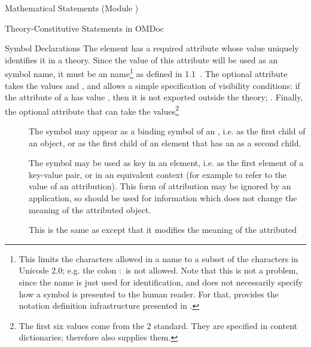 \begin{tchapter}[id=statements,short=Mathematical Statements]{Mathematical Statements (Module {})}
\begin{tsection}[id=definitions]{Theory-Constitutive Statements in OMDoc}
\begin{tsubsection}[id=symbol-dec]{Symbol Declarations}
  The {} element has a required attribute {} whose
  value uniquely identifies it in a theory.  Since the value of this attribute will be
  used as an {\openmath} symbol name, it must be an {\xml} name\footnote{This limits the
    characters allowed in a name to a subset of the characters in Unicode 2.0; e.g. the
    colon $\colon$ is not allowed. Note that this is not a problem, since the name is just
    used for identification, and does not necessarily specify how a symbol is presented to
    the human reader. For that, {\omdoc} provides the notation definition infrastructure
    presented in {}.} as defined in {\xml} 1.1~\cite{xml1.1:04}. The
  optional attribute {} takes the values
  {} and {}, and allows a
  simple specification of visibility conditions: if the {}
  attribute of a {} has value {}, then it is
  not exported outside the theory; .  Finally, the optional attribute {} that can
  take the values\footnote{The first six values come from the {\openmath}2 standard. They
    are specified in content dictionaries; therefore {\omdoc} also supplies them.}
  \begin{description}
  \item[{}] The symbol may appear as a binding symbol of an
    {}, i.e. as the first child of an
    {} object, or as the first child of an
    {} element that has an {} as a second
    child.
  \item[{}] The symbol may be used as key in an
    {\openmath} {} element, i.e. as the first element of a
    key-value pair, or in an equivalent context (for example to refer to the value of an
    attribution).  This form of attribution may be ignored by an application, so should be
    used for information which does not change the meaning of the attributed {\openmath}
    object.
  \item[{}] This is the same as
    {} except that it modifies the meaning of the attributed

\end{description}
\end{tsubsection}
\end{tsection}
\end{tchapter}
